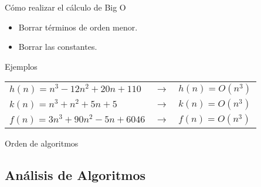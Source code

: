 \documentclass[aspectratio=169]{beamer}
\begin{document}
\begin{frame}{Cómo realizar el cálculo de Big O}
  \begin{itemize}
    \item Borrar términos de orden menor.
    \item Borrar las constantes.
  \end{itemize}
  \begin{block}{Ejemplos}
    \begin{center}
      \begin{tabular}{ l c l }
        $h(n) = n^3 - 12n^2 + 20n + 110$ & $\longrightarrow$ & $h(n) = O(n^3)$ \\
        $k(n) = n^3 + n^2 + 5n + 5$ & $\longrightarrow$ & $k(n) = O(n^3)$ \\
        $f(n) = 3n^3 + 90n^2 - 5n + 6046$ & $\longrightarrow$ & $f(n) = O(n^3)$ \\
      \end{tabular}
    \end{center}
  \end{block}
\end{frame}

\begin{frame}{Orden de algoritmos}
  \begin{center}
  \end{center}
\end{frame}

\subsection{Análisis de Algoritmos}
\end{document}
